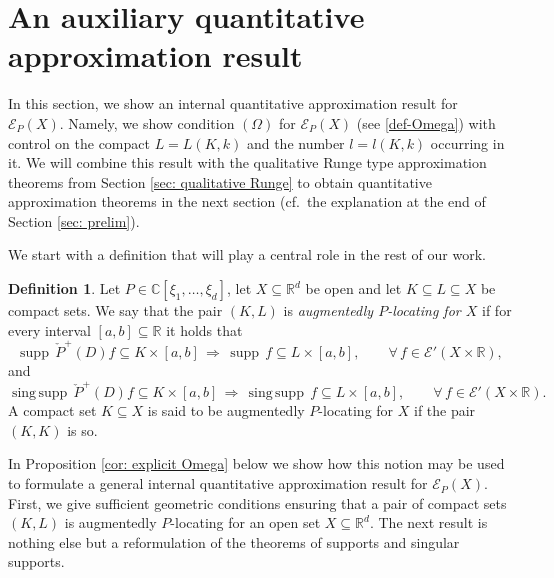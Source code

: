 \documentclass[12pt]{amsart}
\newcommand{\R}{\mathbb{R}}
\newcommand{\C}{\mathbb{C}}
\newcommand{\supp}{\operatorname{supp}\,}
\newcommand{\singsupp}{\operatorname{sing\,supp}\,}
\theoremstyle{definition}
\newtheorem{definition}[theorem]{Definition}
\theoremstyle{remark}
\numberwithin{equation}{section}
\begin{document}
\section{An auxiliary quantitative approximation result}\label{sec: technical}

In this section, we show an internal quantitative approximation result for  $\mathscr{E}_P(X)$. Namely, we show condition $(\Omega)$  for $\mathscr{E}_P(X)$ (see \eqref{def-Omega}) with control on the compact $L= L(K,k)$ and the number $l = l(K,k)$ occurring in it.  We will combine this result with the qualitative Runge type approximation theorems from Section \ref{sec: qualitative Runge} to obtain quantitative approximation theorems in the next section (cf.\ the explanation at the  end of Section \ref{sec: prelim}).

We start with a definition that will play a central role in the rest of our work.

\begin{definition}\label{def: augmenedtly locating}
	Let $P\in\C[\xi_1,\ldots,\xi_d]$, let $X\subseteq\R^d$ be open and let $K \subseteq L \subseteq X$ be compact sets. We say that the pair $(K,L)$ is \emph{augmentedly $P$-locating for $X$} if for every interval $[a,b]\subseteq\R$ it holds that
	\begin{equation}\label{eq: augmentedly locating supports}
	\supp\check{P}^+(D)f\subseteq K\times[a,b] \, \Rightarrow \,\supp f\subseteq L\times[a,b], \qquad 	\forall\, f \in\mathscr{E}'(X\times\R),
	\end{equation}
and 
	\begin{equation}\label{eq: augmentedly locating singular supports}
	\singsupp\check{P}^+(D) f \subseteq K\times[a,b] \, \Rightarrow \, \singsupp f \subseteq L\times[a,b],  \qquad	\forall\, f \in\mathscr{E}'(X\times\R).
	\end{equation}
A compact set $K \subseteq  X$ is said to be augmentedly $P$-locating for $X$ if 
 the pair $(K,K)$ is so.
\end{definition}

In Proposition \ref{cor: explicit Omega} below we show how this notion may be used to formulate a general internal quantitative approximation result for $\mathscr{E}_P(X)$. First, we give sufficient geometric conditions ensuring that a pair of compact sets $(K,L)$  is augmentedly $P$-locating for an open set $X \subseteq \R^d$. The next result is nothing else but a reformulation of the theorems of supports and singular supports.
\end{document}
